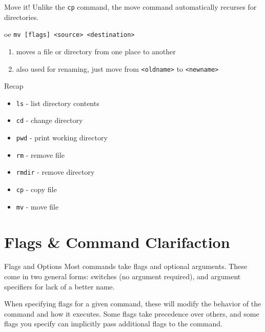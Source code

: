 \begin{frame}[fragile]{Move it!}
  Unlike the \texttt{cp} command, the move command automatically recurses for directories.

  \begin{block}{oe}
    \texttt{mv [flags] <source> <destination>}
    \begin{enumerate}[\--]
      \item moves a file or directory from one place to another
      \item also used for renaming, just move from \texttt{<oldname>} to \texttt{<newname>}
    \end{enumerate}
    \vspace*{1em}
  \end{block}
\end{frame}

\begin{frame}[fragile]{Recap}
  \begin{itemize}
    \item \texttt{ls} \-- list directory contents
    \item \texttt{cd} \-- change directory
    \item \texttt{pwd} \-- print working directory
    \item \texttt{rm} \-- remove file
    \item \texttt{rmdir} \-- remove directory
    \item \texttt{cp} \-- copy file
    \item \texttt{mv} \-- move file
  \end{itemize}
\end{frame}

%

%
\section{Flags \& Command Clarifaction}
\label{sec:flags_&_command_clarifaction}

\begin{frame}[fragile]{Flags and Options}
  Most commands take flags and optional arguments.  These come in two general forms: switches (no argument
  required), and argument specifiers for lack of a better name.

  When specifying flags for a given command, these will modify the behavior of the command and how it
  executes.  Some flags take precedence over others, and some flags you specify can implicitly pass
  additional flags to the command.
\end{frame}

